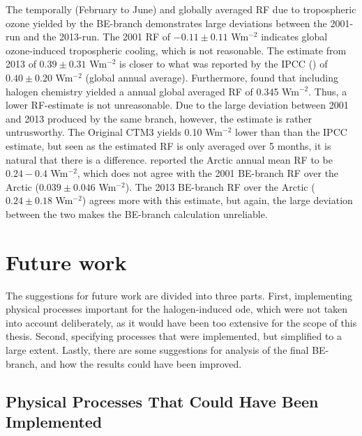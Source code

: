 The temporally (February to June) and globally averaged RF due to tropospheric ozone yielded by the BE-branch demonstrates large deviations between the 2001-run and the 2013-run. The 2001 RF of $-0.11\pm0.11$ Wm$^{-2}$ indicates global ozone-induced tropospheric cooling, which is not reasonable. The estimate from 2013 of $0.39\pm0.31$ Wm$^{-2}$ is closer to what was reported by the IPCC (\cite{IPCCchapter8}) of $0.40\pm0.20$ Wm$^{-2}$ (global annual average). Furthermore, \cite{Sherwen2017} found that including halogen chemistry yielded a annual global averaged RF of 0.345  Wm$^{-2}$. Thus, a lower RF-estimate is not unreasonable. Due to the large deviation between 2001 and 2013 produced by the same branch, however, the estimate is rather untrusworthy. The Original CTM3 yields 0.10 Wm$^{-2}$ lower than than the IPCC estimate, but seen as the estimated RF is only averaged over 5 months, it is natural that there is a difference. \cite{shindell2003} reported the Arctic annual mean RF to be $0.24-0.4$ Wm$^{-2}$, which does not agree with the 2001 BE-branch RF over the Arctic ($0.039\pm0.046$ Wm$^{-2}$). The 2013 BE-branch RF over the Arctic ($0.24\pm0.18$ Wm$^{-2}$) agrees more with this estimate, but again, the large deviation between the two makes the BE-branch calculation unreliable.  


\section{Future work}

The suggestions for future work are divided into three parts. First, implementing physical processes important for the halogen-induced \acrlong{ode}, which were not taken into account deliberately, as it would have been too extensive for the scope of this thesis. Second, specifying processes that were implemented, but simplified to a large extent. Lastly, there are some suggestions for analysis of the final BE-branch, and how the results could have been improved.

\subsection{Physical Processes That Could Have Been Implemented}

